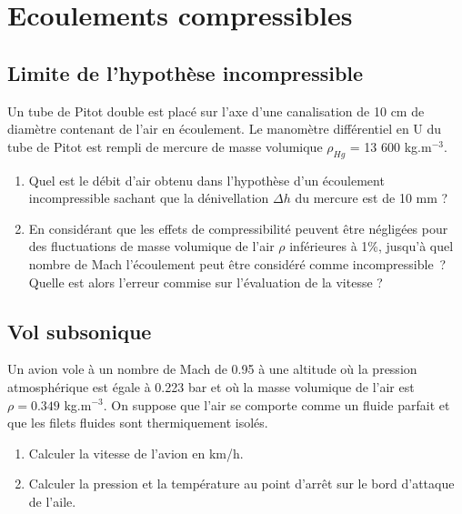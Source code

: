 

\setcounter{section}{10}


\section{Ecoulements compressibles}


\subsection{Limite de l'hypoth\`ese incompressible}

Un tube de Pitot double est plac\'e sur l'axe d'une canalisation de 10 cm
de diam\`etre contenant de l'air en \'ecoulement.
Le manom\`etre diff\'erentiel en U du tube de Pitot est rempli de mercure
de masse volumique $\rho_{Hg}$ = 13 600 kg.m$^{-3}$.
\begin{enumerate}
\item
Quel est le d\'ebit d'air obtenu dans l'hypoth\`ese d'un \'ecoulement
incompressible sachant que la d\'enivellation $\Delta h$ du mercure est
de 10 mm ?
\item
En consid\'erant que les effets de compressibilit\'e peuvent \^etre
n\'eglig\'ees pour des fluctuations de masse volumique de l'air $\rho$
inf\'erieures \`a 1\%,
jusqu'\`a quel nombre de Mach l'\'ecoulement peut \^etre consid\'er\'e
comme incompressible~?
Quelle est alors l'erreur commise sur l'\'evaluation de la vitesse ?
\end{enumerate}

\subsection{Vol subsonique}

Un avion vole \`a un nombre de Mach de 0.95 \`a une altitude o\`u la pression
atmosph\'erique est \'egale \`a 0.223 bar et o\`u la masse volumique de l'air
est $\rho=0.349$ kg.m$^{-3}$.
On suppose que l'air se comporte comme un fluide parfait et que les filets
fluides sont thermiquement isol\'es.
\begin{enumerate}
\item
Calculer la vitesse de l'avion en km/h.
\item
Calculer la pression et la temp\'erature au point d'arr\^et sur le bord
d'attaque de l'aile.
\end{enumerate}
 
